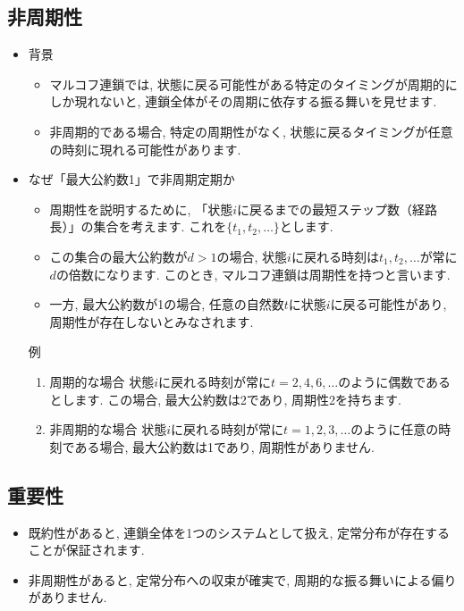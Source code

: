 \documentclass[a4j]{jsarticle}
\begin{document}
{	\subsection*{非周期性}
	\begin{itemize}
		\item 背景
		      \begin{itemize}
			      \item マルコフ連鎖では, 状態に戻る可能性がある特定のタイミングが周期的にしか現れないと, 連鎖全体がその周期に依存する振る舞いを見せます.
			      \item 非周期的である場合, 特定の周期性がなく, 状態に戻るタイミングが任意の時刻に現れる可能性があります.
		      \end{itemize}
		\item なぜ「最大公約数1」で非周期定期か
		      \begin{itemize}
			      \item 周期性を説明するために, 「状態$i$に戻るまでの最短ステップ数（経路長）」の集合を考えます. これを$\{t_1,t_2,\ldots\}$とします.
			      \item この集合の最大公約数が$d > 1$の場合, 状態$i$に戻れる時刻は$t_1,t_2,\ldots$が常に$d$の倍数になります. このとき, マルコフ連鎖は周期性を持つと言います.
			      \item 一方, 最大公約数が1の場合, 任意の自然数$t$に状態$i$に戻る可能性があり, 周期性が存在しないとみなされます.
		      \end{itemize}
		      例
		      \begin{enumerate}
			      \item 周期的な場合
			            状態$i$に戻れる時刻が常に$t = 2, 4, 6, \ldots$のように偶数であるとします. この場合, 最大公約数は2であり, 周期性2を持ちます.
			      \item 非周期的な場合
			            状態$i$に戻れる時刻が常に$t = 1, 2, 3, \ldots$のように任意の時刻である場合, 最大公約数は1であり, 周期性がありません.
		      \end{enumerate}
	\end{itemize}
	\subsection*{重要性}
	\begin{itemize}
		\item 既約性があると, 連鎖全体を1つのシステムとして扱え, 定常分布が存在することが保証されます.
		\item 非周期性があると, 定常分布への収束が確実で, 周期的な振る舞いによる偏りがありません.
	\end{itemize}
}
\\
\end{document}
